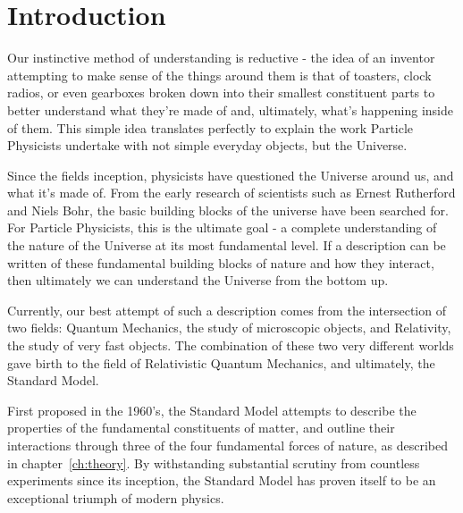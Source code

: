 
\chapter{Introduction}  %

\ifpdf
    \graphicspath{{Chapter1/Figs/Raster/}{Chapter1/Figs/PDF/}{Chapter1/Figs/}}
\else
    \graphicspath{{Chapter1/Figs/Vector/}{Chapter1/Figs/}}
\fi


\label{sec:introduction_intro}

Our instinctive method of understanding is reductive - the idea of an
inventor attempting to make sense of the things around them is
that of toasters, clock radios, or even gearboxes broken down into
their smallest constituent parts to better understand what they're made of and,
ultimately, what's happening inside of them. This simple idea translates
perfectly to explain the work Particle Physicists undertake with
not simple everyday objects, but the Universe.

Since the fields inception, physicists have questioned the Universe
around us, and what it's made of. From the early research of scientists such as
Ernest Rutherford and Niels Bohr, the basic building
blocks of the universe have been searched for. For Particle Physicists, this is
the ultimate goal - a complete understanding of the nature of the Universe
at its most
fundamental level. If a description can be written of these fundamental
building blocks of
nature and how they interact, then ultimately we can understand
the Universe from the bottom up.

Currently, our best attempt of such a description comes from the intersection of
two
fields: Quantum Mechanics, the study of microscopic objects, and Relativity, the
study of very fast objects. The combination of these
two very different worlds gave birth to the field of Relativistic
Quantum Mechanics, and ultimately, the Standard Model.

First proposed in the 1960's, the Standard Model attempts to describe the
properties of the fundamental constituents of matter, and outline their
interactions through three of the four fundamental forces of nature, as
described in chapter~\ref{ch:theory}.
By withstanding substantial scrutiny from countless experiments since its
inception, the Standard Model has proven itself to be an exceptional
triumph of modern physics.

